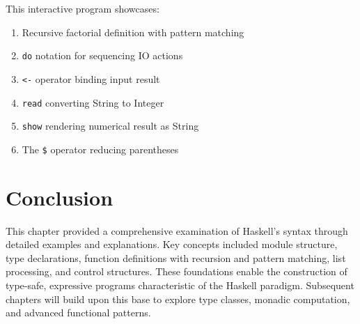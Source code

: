 \documentclass{book}
\begin{document}
This interactive program showcases:
\begin{enumerate}
\item Recursive factorial definition with pattern matching
\item \texttt{do} notation for sequencing IO actions
\item \texttt{<-} operator binding input result
\item \texttt{read} converting String to Integer
\item \texttt{show} rendering numerical result as String
\item The \texttt{\$} operator reducing parentheses
\end{enumerate}

\section*{Conclusion}
This chapter provided a comprehensive examination of Haskell's syntax through detailed examples and explanations. Key concepts included module structure, type declarations, function definitions with recursion and pattern matching, list processing, and control structures. These foundations enable the construction of type-safe, expressive programs characteristic of the Haskell paradigm. Subsequent chapters will build upon this base to explore type classes, monadic computation, and advanced functional patterns.
\end{document}

